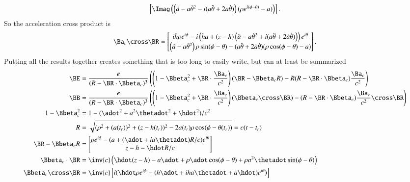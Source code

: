 {\begin{equation}
\begin{aligned}
\begin{bmatrix}
\Imag \left(
\left( \ddot{a} - a {\dot{\theta}}^2 - i ( a\ddot{\theta} + 2 \dot{a} \dot{\theta} ) \right) ( \rho e^{i(\phi -\theta)} - a )
\right)
\end{bmatrix}.
\end{aligned}
\end{equation}
%
So the acceleration cross product is
%
\begin{equation}\label{eqn:relativisticElectrodynamicsExamReflection:980}
\Ba_c \cross \BR
=
\begin{bmatrix}
i \ddot{h} \rho e^{i\phi}
- i \left( \ddot{h} a + (z - h) \left( \ddot{a} - a {\dot{\theta}}^2 + i ( a\ddot{\theta} + 2 \dot{a} \dot{\theta} ) \right) \right) e^{i\theta} \\
\left( \ddot{a} - a {\dot{\theta}}^2 \right) \rho \sin(\phi - \theta)
-( a\ddot{\theta} + 2 \dot{a} \dot{\theta} ) (\rho \cos(\phi -\theta) - a)
\end{bmatrix}.
\end{equation}
%
Putting all the results together creates something that is too long to easily write, but can at least be summarized
%
\begin{equation}\label{eqn:relativisticElectrodynamicsExamReflection:990}
\begin{aligned}
\BE
&=
\frac{e}{(R - \BR \cdot \Bbeta_c)^3}\left(
\left(1 - \Bbeta_c^2 + \BR \cdot \frac{\Ba_c}{c^2}
\right) (\BR - \Bbeta_c R)
- R(R - \BR \cdot \Bbeta_c) \frac{\Ba_c}{c^2}
\right) \\
\BB
&=
\frac{e}{(R - \BR \cdot \Bbeta_c)^3}\left(
\left(1 - \Bbeta_c^2 + \BR \cdot \frac{\Ba_c}{c^2}
\right) (\Bbeta_c \cross \BR)
- (R - \BR \cdot \Bbeta_c) \frac{\Ba_c}{c^2} \cross \BR
\right) \\
1 - \Bbeta_c^2 &= 1 - (\adot^2 + a^2 \thetadot^2 + \hdot^2)/c^2 \\
R &= \sqrt{(\rho^2 + (a(t_r))^2 + (z-h(t_r))^2 - 2 a(t_r) \rho \cos(\phi - \theta(t_r))} = c( t - t_r) \\
\BR - \Bbeta_c R &=
\begin{bmatrix}
\rho e^{i\phi} - (a + (\adot + i a\thetadot) R/c) e^{i\theta} \\
z - h - \hdot R/c
\end{bmatrix} \\
\Bbeta_c \cdot \BR &= \inv{c}\left( \hdot (z - h) -a \adot + \rho \adot \cos(\phi- \theta) + \rho a^2 \thetadot \sin(\phi - \theta) \right) \\
\Bbeta_c \cross \BR
&=
\inv{c}
\begin{bmatrix}
i( \hdot \rho e^{i\phi} - (h \adot + i h a \thetadot + a \hdot) e^{i\theta} ) \\

\end{bmatrix}
\end{aligned}
\end{equation}}
